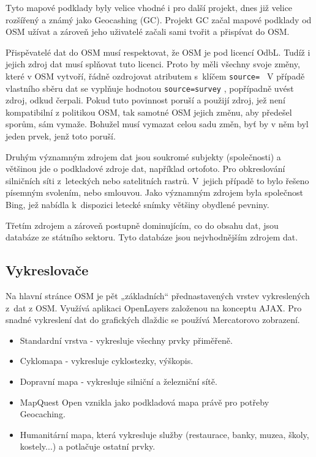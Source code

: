Tyto mapové podklady byly velice vhodné i pro další projekt, dnes již
velice rozšířený a známý jako Geocashing (GC). Projekt GC začal mapové
podklady od OSM užívat a zároveň jeho uživatelé začali sami tvořit a
přispívat do OSM. 

Přispěvatelé dat do OSM musí respektovat, že OSM je pod licencí OdbL.
Tudíž i jejich zdroj dat musí splňovat tuto licenci. Proto by měli
všechny svoje změny, které v OSM vytvoří, řádně ozdrojovat atributem
s~klíčem 
{\tt source= }
V případě vlastního sběru dat se vyplňuje hodnotou
{\tt source=survey} ,
popřípadně uvést zdroj, odkud čerpali. Pokud tuto povinnost poruší a
použijí zdroj, jež není kompatibilní z politikou OSM, tak samotné OSM
jejich změnu, aby předešel sporům, sám vymaže. Bohužel musí vymazat
celou sadu změn, byť by v něm byl jeden prvek, jenž toto poruší.

Druhým významným zdrojem dat jsou soukromé subjekty (společnosti) a
většinou jde o podkladové zdroje dat, například ortofoto. Pro obkreslování
silničních síti z~leteckých nebo satelitních rastrů. V~jejich případě to
bylo řešeno písemným svolením, nebo smlouvou. Jako významným zdrojem byla
společnost Bing, jež nabídla k~dispozici letecké snímky většiny
obydlené pevniny. 

Třetím zdrojem a zároveň postupně dominujícím, co do obsahu dat, jsou
databáze ze státního sektoru. Tyto databáze jsou nejvhodnějším zdrojem
dat.

\subsection{Vykreslovače}
\label{Vykreslovače}
Na hlavní stránce OSM je pět „základních“ přednastavených vrstev vykreslených 
z~dat z OSM. Využívá aplikaci OpenLayers založenou na konceptu AJAX.
Pro snadné vykreslení dat do grafických dlaždic se používá Mercatorovo zobrazení.

\begin{itemize}

  \item Standardní vrstva - vykresluje všechny prvky přiměřeně.
  \item Cyklomapa - vykresluje cyklostezky, výškopis. 
  \item Dopravní mapa - vykresluje silniční a železniční sítě.
  \item MapQuest Open vznikla jako podkladová mapa právě pro potřeby 
Geocaching.
  \item Humanitární mapa, která vykresluje služby (restaurace, banky, muzea, 
  školy, kostely...)  a potlačuje ostatní prvky. 

\end{itemize}

